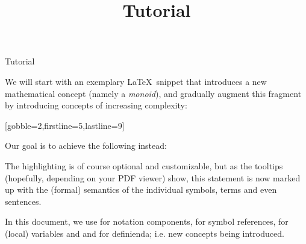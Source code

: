 \documentclass[lang={en,de}]{stex}
\begin{document}
\iffalse
\begin{dangerbox} foo \end{dangerbox}
\begin{mmtbox} foo \end{mmtbox}
\begin{sparagraph}[style={defibox,symdoc}]
  foo
\end{sparagraph}
\fi

\ifinputref
  \begin{sfragment}{Tutorial}
\else
  \title{\sTeX Tutorial}
  \maketitle
  \tableofcontents\bigskip
\fi


    We will start with an exemplary \LaTeX\ snippet that introduces
    a new mathematical concept (namely a \emph{monoid}), and gradually
    augment this fragment by introducing \sTeX concepts of
    increasing complexity:

    [gobble=2,firstline=5,lastline=9]

    Our goal is to achieve the following instead:

    \begin{sexample}
      \begin{framed}\end{framed}
    \end{sexample}
    The highlighting is of course optional and customizable, but
    as the tooltips (hopefully, depending on your PDF viewer)
    show, this statement is now marked up with the (formal)
    semantics of the individual symbols, terms and even sentences.

    \ifstexhtml\else
      In this document, we use  for notation
      components,  for symbol references,
       for (local) variables and
      and  for definienda; i.e.
      new concepts being introduced. 
    \fi
    


\end{sfragment}
\end{document}
